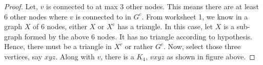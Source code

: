\documentclass[12pt]{article}
\begin{document}
\begin{proof}
Let, $v$ is connected to at max $3$ other nodes. This means there are at least $6$ other nodes where $v$ is connected to in $G^{c}$. From worksheet 1, we know in a graph $X$ of 6 nodes, either $X$ or $X^{c}$ has a triangle. In this case, let $X$ is a sub-graph formed by the above $6$ nodes. It has no triangle according to hypothesis. Hence, there must be a triangle in $X^{c}$ or rather $G^{c}$. Now, select those three vertices, say $xyz$. Along with $v$, there is a $K_4$, $vxyz$ as shown in figure above.



\end{proof}
\end{document}
